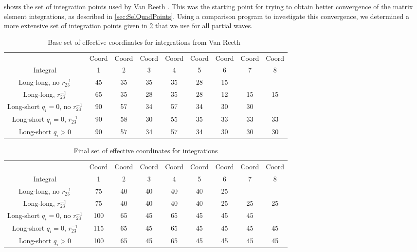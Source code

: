 \documentclass[Dissertation.tex]{subfiles}
\begin{document}
 shows the set of integration points used by Van
Reeth \cite{VanReethPrivate}. This was the starting point for trying to obtain
better convergence of the matrix element integrations, as described in
\cref{sec:SelQuadPoints}. Using a comparison program to investigate this
convergence, we determined a more extensive set of integration points given
in \cref{tab:OptimalEffectiveCoords} that we use for all partial waves.

\begin{table}
\centering
\footnotesize
\begin{tabular}{c c c c c c c c c}
\toprule
 & Coord & Coord & Coord & Coord & Coord & Coord & Coord & Coord\\
Integral & 1 & 2 & 3 & 4 & 5 & 6 & 7 & 8 \\
\midrule
 Long-long, no $r_{23}^{-1}$ & 45 & 35 & 35 & 35 & 28 & 15 & & \\
 Long-long, $r_{23}^{-1}$ & 65 & 35 & 28 & 35 & 28 & 12 & 15 & 15 \\
\midrule
 Long-short $q_i = 0$, no $r_{23}^{-1}$ & 90 & 57 & 34 & 57 & 34 & 30 & 30 & \\
 Long-short $q_i = 0$, $r_{23}^{-1}$ & 90 & 58 & 30 & 55 & 35 & 33 & 33 & 33 \\
 Long-short $q_i > 0$ & 90 & 57 & 34 & 57 & 34 & 30 & 30 & 30 \\
\bottomrule
\end{tabular}
\caption{Base set of effective coordinates for integrations from Van Reeth~\cite{VanReethPrivate}}
\label{tab:BaseEffectiveCoords}
\end{table}

\begin{table}
\centering
\footnotesize
\begin{tabular}{c c c c c c c c c}
\toprule
 & Coord & Coord & Coord & Coord & Coord & Coord & Coord & Coord\\
Integral & 1 & 2 & 3 & 4 & 5 & 6 & 7 & 8 \\
\midrule
 Long-long, no $r_{23}^{-1}$			&  75 & 40 & 40 & 40 & 40 & 25 & & \\
 Long-long, $r_{23}^{-1}$				&  75 & 40 & 40 & 40 & 40 & 25 & 25 & 25 \\
\midrule
 Long-short $q_i = 0$, no $r_{23}^{-1}$	& 100 & 65 & 45 & 65 & 45 & 45 & 45 & \\
 Long-short $q_i = 0$, $r_{23}^{-1}$	& 115 & 65 & 45 & 65 & 45 & 45 & 45 & 45 \\
 Long-short $q_i > 0$					& 100 & 65 & 45 & 65 & 45 & 45 & 45 & 45 \\
\bottomrule
\end{tabular}
\caption{Final set of effective coordinates for integrations}
\label{tab:OptimalEffectiveCoords}
\end{table}
\end{document}
